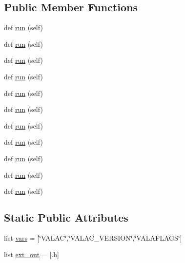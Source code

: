 \subsection*{Public Member Functions}
\begin{DoxyCompactItemize}
\item 
def \hyperlink{classwaflib_1_1_tools_1_1vala_1_1valac_a605d28e4c33834d34d4a10a21d657f77}{run} (self)
\item 
def \hyperlink{classwaflib_1_1_tools_1_1vala_1_1valac_a605d28e4c33834d34d4a10a21d657f77}{run} (self)
\item 
def \hyperlink{classwaflib_1_1_tools_1_1vala_1_1valac_a605d28e4c33834d34d4a10a21d657f77}{run} (self)
\item 
def \hyperlink{classwaflib_1_1_tools_1_1vala_1_1valac_a605d28e4c33834d34d4a10a21d657f77}{run} (self)
\item 
def \hyperlink{classwaflib_1_1_tools_1_1vala_1_1valac_a605d28e4c33834d34d4a10a21d657f77}{run} (self)
\item 
def \hyperlink{classwaflib_1_1_tools_1_1vala_1_1valac_a605d28e4c33834d34d4a10a21d657f77}{run} (self)
\item 
def \hyperlink{classwaflib_1_1_tools_1_1vala_1_1valac_a605d28e4c33834d34d4a10a21d657f77}{run} (self)
\item 
def \hyperlink{classwaflib_1_1_tools_1_1vala_1_1valac_a605d28e4c33834d34d4a10a21d657f77}{run} (self)
\item 
def \hyperlink{classwaflib_1_1_tools_1_1vala_1_1valac_a605d28e4c33834d34d4a10a21d657f77}{run} (self)
\item 
def \hyperlink{classwaflib_1_1_tools_1_1vala_1_1valac_a605d28e4c33834d34d4a10a21d657f77}{run} (self)
\item 
def \hyperlink{classwaflib_1_1_tools_1_1vala_1_1valac_a605d28e4c33834d34d4a10a21d657f77}{run} (self)
\end{DoxyCompactItemize}
\subsection*{Static Public Attributes}
\begin{DoxyCompactItemize}
\item 
list \hyperlink{classwaflib_1_1_tools_1_1vala_1_1valac_a0ee3c3bbaf3101f29bb38f1cda5befa8}{vars} = \mbox{[}\char`\"{}V\+A\+L\+AC\char`\"{},\char`\"{}V\+A\+L\+A\+C\+\_\+\+V\+E\+R\+S\+I\+ON\char`\"{},\char`\"{}V\+A\+L\+A\+F\+L\+A\+GS\char`\"{}\mbox{]}
\item 
list \hyperlink{classwaflib_1_1_tools_1_1vala_1_1valac_a25947a1acce51cf10cde7b8d66f932b6}{ext\+\_\+out} = \mbox{[}\textquotesingle{}.h\textquotesingle{}\mbox{]}
\end{DoxyCompactItemize}
